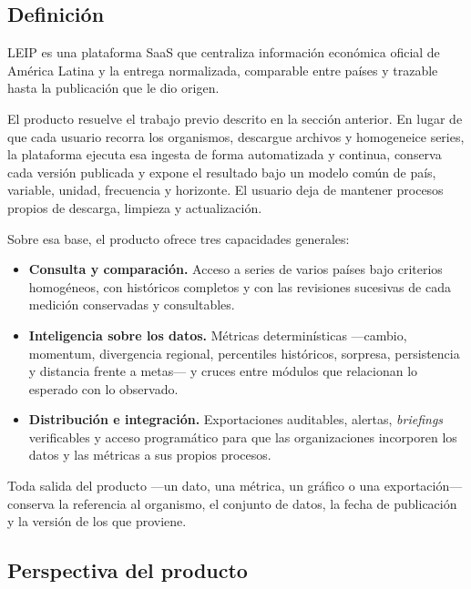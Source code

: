 \documentclass[11pt,a4paper]{article}
\newcommand{\proyectoNombre}{LEIP}
\begin{document}
\subsection{Definici\'on}

\proyectoNombre{} es una plataforma SaaS que centraliza informaci\'on
econ\'omica oficial de Am\'erica Latina y la entrega normalizada, comparable
entre pa\'ises y trazable hasta la publicaci\'on que le dio origen.

El producto resuelve el trabajo previo descrito en la secci\'on anterior. En
lugar de que cada usuario recorra los organismos, descargue archivos y
homogeneice series, la plataforma ejecuta esa ingesta de forma automatizada y
continua, conserva cada versi\'on publicada y expone el resultado bajo un modelo
com\'un de pa\'is, variable, unidad, frecuencia y horizonte. El usuario deja de
mantener procesos propios de descarga, limpieza y actualizaci\'on.

Sobre esa base, el producto ofrece tres capacidades generales:

\begin{itemize}
  \item \textbf{Consulta y comparaci\'on.} Acceso a series de varios pa\'ises
        bajo criterios homog\'eneos, con hist\'oricos completos y con las
        revisiones sucesivas de cada medici\'on conservadas y consultables.
  \item \textbf{Inteligencia sobre los datos.} M\'etricas determin\'isticas
        ---cambio, momentum, divergencia regional, percentiles hist\'oricos,
        sorpresa, persistencia y distancia frente a metas--- y cruces entre
        m\'odulos que relacionan lo esperado con lo observado.
  \item \textbf{Distribuci\'on e integraci\'on.} Exportaciones auditables,
        alertas, \emph{briefings} verificables y acceso program\'atico para que
        las organizaciones incorporen los datos y las m\'etricas a sus propios
        procesos.
\end{itemize}

Toda salida del producto ---un dato, una m\'etrica, un gr\'afico o una
exportaci\'on--- conserva la referencia al organismo, el conjunto de datos, la
fecha de publicaci\'on y la versi\'on de los que proviene.

\subsection{Perspectiva del producto}
\end{document}
